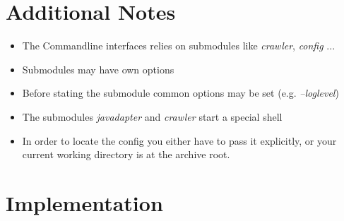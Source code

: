 \documentclass[letterpaper,10pt,english]{sphinxmanual}
\begin{document}
\section{Additional Notes}
\label{cli:additional-notes}\begin{itemize}
\item {} 
The Commandline interfaces relies on submodules like \emph{crawler}, \emph{config} ...

\item {} 
Submodules may have own options

\item {} 
Before stating the submodule common options may be set (e.g. \emph{--loglevel})

\item {} 
The submodules \emph{javadapter} and \emph{crawler} start a special shell

\item {} 
In order to locate the config you either have to pass it explicitly, or your current working directory is at the archive root.

\end{itemize}


\section{Implementation}
\label{cli:implementation}
\end{document}
